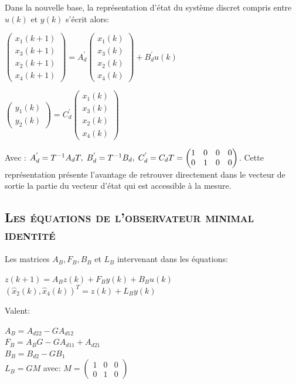 Dans la nouvelle base, la représentation d'état du système discret compris entre $u(k)$ et $ y(k)$ s'écrit alors:


\begin{center}

$\begin{pmatrix}
	  x_1(k+1) \\  x_3(k+1)  \\ x_2(k+1) \\   x_4(k+1)
\end{pmatrix}= A^{'}_d \begin{pmatrix}
	  x_1(k) \\  x_3(k)  \\ x_2(k) \\   x_4(k)
\end{pmatrix} + B^{'}_d u(k)$
\end{center}


 
\begin{center}

$\begin{pmatrix}
	  y_1(k) \\  y_2(k) 
\end{pmatrix}= C^{'}_d \begin{pmatrix}
	  x_1(k) \\  x_3(k)  \\ x_2(k) \\   x_4(k)
\end{pmatrix}$
\end{center}

Avec : $A^{'}_d = T^{-1}A_dT,\hspace{1 mm} B^{'}_d = T^{-1}B_d, \hspace{1 mm} C^{'}_d=C_dT=\begin{pmatrix}
	  1 & 0 & 0 & 0\\ 0 & 1 & 0 & 0 
\end{pmatrix}$. Cette représentation présente l'avantage de retrouver directement dans le vecteur de sortie la partie du vecteur d'état qui est accessible à la mesure.

 \subsection{\textsc{ Les équations de l'observateur minimal identité }}
 
 Les matrices $A_B,F_B,B_B$ et $L_B$ intervenant dans les équations:

\begin{center}
	$z(k+1) =  A_Bz(k) + F_By(k) + B_Bu(k)$\\
	$ (\hat{x}_2(k),\hat{x}_4(k))^T= z(k)+ L_By(k) $
\end{center}
Valent:

\begin{center}
	$  A_B = A_{d22} - GA_{d12} $\\[0.25 cm]  
	$  F_B = A_B G - GA_{d11} + A_{d21} $\\ [0.25 cm]  
	$  B_B = B_{d2} - GB_1 $\\ [0.25 cm]  
	$  L_B = GM $ avec: $M=\begin{pmatrix} 1 & 0 & 0 \\  0 & 1 & 0 \end{pmatrix}$
\end{center}

